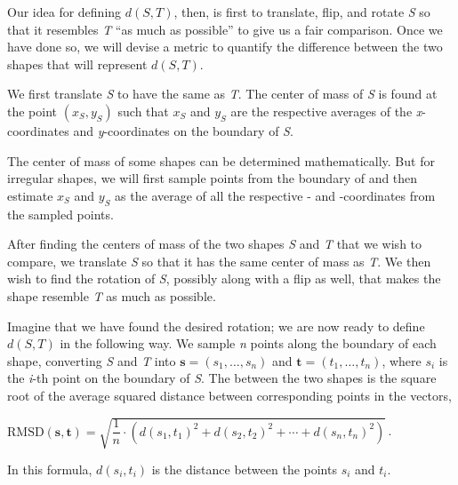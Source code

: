 Our idea for defining $d(S, T)$, then, is first to translate, flip, and rotate \textit{S} so that it resembles \textit{T} ``as much as possible'' to give us a fair comparison. Once we have done so, we will devise a metric to quantify the difference between the two shapes that will represent $d(S, T)$.

We first translate \textit{S} to have the same  as \textit{T}. The center of mass of \textit{S} is found at the point $(x_{S}, y_{S})$ such that $x_{S}$ and $y_{S}$ are the respective averages of the \textit{x}-coordinates and \textit{y}-coordinates on the boundary of \textit{S}.

The center of mass of some shapes can be determined mathematically. But for irregular shapes, we will first sample  points from the boundary of  and then estimate $x_S$ and $y_S$ as the average of all the respective - and -coordinates from the sampled points.

After finding the centers of mass of the two shapes \textit{S} and \textit{T} that we wish to compare, we translate \textit{S} so that it has the same center of mass as \textit{T}. We then wish to find the rotation of \textit{S}, possibly along with a flip as well, that makes the shape resemble \textit{T} as much as possible.

Imagine that we have found the desired rotation; we are now ready to define $d(S, T)$ in the following way. We sample \textit{n} points along the boundary of each shape, converting \textit{S} and \textit{T} into  $\mathbf{s} = (s_{1}, \ldots, s_{n})$ and $\mathbf{t} = (t_{1}, \ldots, t_{n})$, where $s_{i}$ is the \textit{i}-th point on the boundary of \textit{S}. The  between the two shapes is the square root of the average squared distance between corresponding points in the vectors,

\begin{center}
$\text{RMSD}(\mathbf{s}, \mathbf{t}) = \sqrt{\dfrac{1}{n} \cdot \left(d(s_1, t_1)^2 + d(s_2, t_2)^2 + \cdots + d(s_n, t_n)^2\right)}$\,.
\end{center}

\noindent In this formula, $d(s_{i}, t_{i})$ is the distance between the points $s_{i}$ and $t_{i}$.\\

